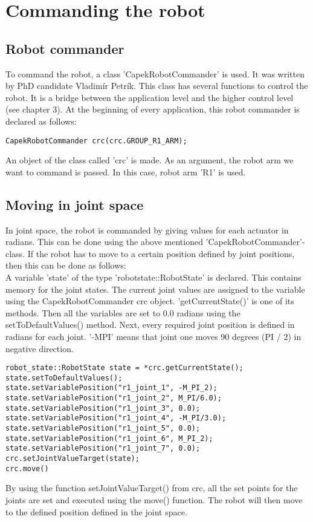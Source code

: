 \documentclass[11pt,a4paper]{report}
\begin{document}
\section{Commanding the robot}
\subsection{Robot commander}\label{RobotCommander}
To command the robot, a class 'CapekRobotCommander' is used. It was written by PhD candidate Vladim\' ir Petr\' ik. This class has several functions to control the robot. It is a bridge between the application level and the higher control level (see chapter 3). At the beginning of every application, this robot commander is declared as follows:
\begin{verbatim}
CapekRobotCommander crc(crc.GROUP_R1_ARM);
\end{verbatim}
An object of the class called 'crc' is made. As an argument, the robot arm we want to command is passed. In this case, robot arm 'R1' is used.
\subsection{Moving in joint space}\label{MovingJoint}
In joint space, the robot is commanded by giving values for each actuator in radians. This can be done using the above mentioned 'CapekRobotCommander'-class. If the robot has to move to a certain position defined by joint positions, then this can be done as follows:\\
A variable 'state' of the type 'robot\textunderscore state::RobotState' is declared. This contains memory for the joint states. The current joint values are assigned to the variable using the CapekRobotCommander crc object. 'getCurrentState()' is one of its methods. Then all the variables are set to 0.0 radians using the setToDefaultValues() method. Next, every required joint position is defined in radians for each joint. '-M\textunderscore PI' means that joint one moves 90 degrees (PI / 2) in negative direction.
\begin{verbatim}
robot_state::RobotState state = *crc.getCurrentState();
state.setToDefaultValues();
state.setVariablePosition("r1_joint_1", -M_PI_2);
state.setVariablePosition("r1_joint_2", M_PI/6.0);
state.setVariablePosition("r1_joint_3", 0.0);
state.setVariablePosition("r1_joint_4", -M_PI/3.0);
state.setVariablePosition("r1_joint_5", 0.0);
state.setVariablePosition("r1_joint_6", M_PI_2);
state.setVariablePosition("r1_joint_7", 0.0);
crc.setJointValueTarget(state);
crc.move()
\end{verbatim}
By using the function setJointValueTarget() from crc, all the set points for the joints are set and executed using the move() function. The robot will then move to the defined position defined in the joint space.
\end{document}

